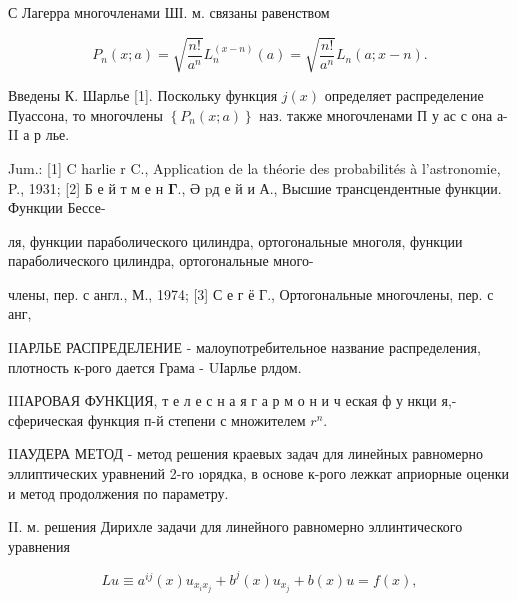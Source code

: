 \documentclass[10pt]{article}
\begin{document}
С Лагерра многочленами ШІ. м. связаны равенством



\[

P_{n}(x ; a)=\sqrt{\frac{n !}{a^{n}}} L_{n}^{(x-n)}(a)=\sqrt{\frac{n !}{a^{n}}} L_{n}(a ; x-n) .

\]



Введены К. Шарлье [1]. Поскольку функция $j(x)$ определяет распределение Пуассона, то многочлены $\left\{P_{n}(x ; a)\right\}$ наз. также многочленами П у ас с она а-II а р лье.



Jum.: [1] C harlie r C., Application de la théorie des probabilités à l'astronomie, P., 1931; [2] Б е й т м е н $\mathbf{\Gamma}$., Ә pд е й и А., Высшие трансцендентные функции. Функции Бессе-

ля, функции параболического цилиндра, ортогональные многоля, функции параболического цилиндра, ортогональные много-

члены, пер. с англ., М., 1974; [3] С е г ё Г., Ортогональные многочлены, пер. с анг,



IIАРЛЬЕ РАСПРЕДЕЛЕНИЕ - малоупотребительное название распределения, плотность к-рого дается Грама - UІарлье рлдом.



IIIАРОВАЯ ФУНКЦИЯ, т е л е с н а я г а р м о н и ч еская ф у нкци я,- сферическая функция п-й степени с множителем $r^{n}$.



IIАУДЕРА МЕТОД - метод решения краевых задач для линейных равномерно эллиптических уравнений 2-го ıорядка, в основе к-рого лежкат априорные оценки и метод продолжения по параметру.



II. м. решения Дирихле задачи для линейного равномерно эллинтического уравнения



\[

L u \equiv a^{i j}(x) u_{x_{i} x_{j}}+b^{j}(x) u_{x_{j}}+b(x) u=f(x),

\]
\end{document}
